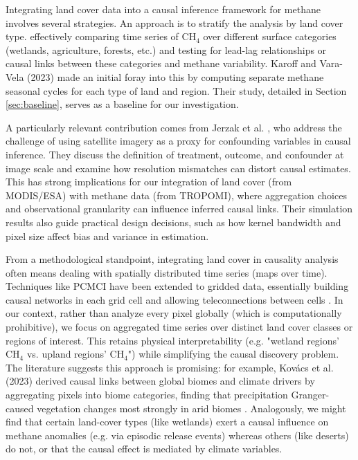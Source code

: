 Integrating land cover data into a causal inference framework for methane involves several strategies. An approach is to stratify the analysis by land cover type. effectively comparing time series of CH$_4$ over different surface categories (wetlands, agriculture, forests, etc.) and testing for lead-lag relationships or causal links between these categories and methane variability. Karoff and Vara-Vela (2023) \cite{Karoff2023} made an initial foray into this by computing separate methane seasonal cycles for each type of land and region. Their study, detailed in Section \ref{sec:baseline}, serves as a baseline for our investigation.

A particularly relevant contribution comes from Jerzak et al. \cite{jerzak2023}, who address the challenge of using satellite imagery as a proxy for confounding variables in causal inference. They discuss the definition of treatment, outcome, and confounder at image scale and examine how resolution mismatches can distort causal estimates. This has strong implications for our integration of land cover (from MODIS/ESA) with methane data (from TROPOMI), where aggregation choices and observational granularity can influence inferred causal links. Their simulation results also guide practical design decisions, such as how kernel bandwidth and pixel size affect bias and variance in estimation.

From a methodological standpoint, integrating land cover in causality analysis often means dealing with spatially distributed time series (maps over time). Techniques like PCMCI have been extended to gridded data, essentially building causal networks in each grid cell and allowing teleconnections between cells \cite{Runge2019, Runge2020EGU}. In our context, rather than analyze every pixel globally (which is computationally prohibitive), we focus on aggregated time series over distinct land cover classes or regions of interest. This retains physical interpretability (e.g. "wetland regions' CH$_4$ vs. upland regions' CH$_4$") while simplifying the causal discovery problem. The literature suggests this approach is promising: for example, Kovács et al. (2023) \cite{Kovacs2023} derived causal links between global biomes and climate drivers by aggregating pixels into biome categories, finding that precipitation Granger-caused vegetation changes most strongly in arid biomes \cite{Kovacs2023}. Analogously, we might find that certain land-cover types (like wetlands) exert a causal influence on methane anomalies (e.g. via episodic release events) whereas others (like deserts) do not, or that the causal effect is mediated by climate variables. 


